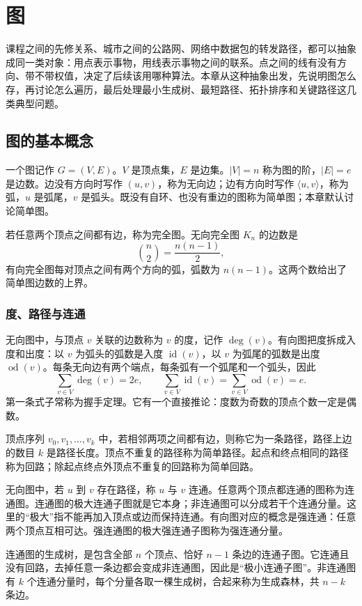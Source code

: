 \section{图}

课程之间的先修关系、城市之间的公路网、网络中数据包的转发路径，都可以抽象成同一类对象：用点表示事物，用线表示事物之间的联系。点之间的线有没有方向、带不带权值，决定了后续该用哪种算法。本章从这种抽象出发，先说明图怎么存，再讨论怎么遍历，最后处理最小生成树、最短路径、拓扑排序和关键路径这几类典型问题。

\subsection{图的基本概念}

一个图记作 $G=(V,E)$。$V$ 是顶点集，$E$ 是边集。$|V|=n$ 称为图的阶，$|E|=e$ 是边数。边没有方向时写作 $(u,v)$，称为无向边；边有方向时写作 $\langle u,v\rangle$，称为弧，$u$ 是弧尾，$v$ 是弧头。既没有自环、也没有重边的图称为简单图；本章默认讨论简单图。

若任意两个顶点之间都有边，称为完全图。无向完全图 $K_n$ 的边数是
\[
\binom{n}{2}=\frac{n(n-1)}{2},
\]
有向完全图每对顶点之间有两个方向的弧，弧数为 $n(n-1)$。这两个数给出了简单图边数的上界。

\subsubsection{度、路径与连通}

无向图中，与顶点 $v$ 关联的边数称为 $v$ 的度，记作 $\deg(v)$。有向图把度拆成入度和出度：以 $v$ 为弧头的弧数是入度 $\operatorname{id}(v)$，以 $v$ 为弧尾的弧数是出度 $\operatorname{od}(v)$。每条无向边有两个端点，每条弧有一个弧尾和一个弧头，因此
\[
\sum_{v\in V}\deg(v)=2e,
\qquad
\sum_{v\in V}\operatorname{id}(v)
=\sum_{v\in V}\operatorname{od}(v)=e.
\]
第一条式子常称为握手定理。它有一个直接推论：度数为奇数的顶点个数一定是偶数。

顶点序列 $v_0,v_1,\ldots,v_k$ 中，若相邻两项之间都有边，则称它为一条路径，路径上边的数目 $k$ 是路径长度。顶点不重复的路径称为简单路径。起点和终点相同的路径称为回路；除起点终点外顶点不重复的回路称为简单回路。

无向图中，若 $u$ 到 $v$ 存在路径，称 $u$ 与 $v$ 连通。任意两个顶点都连通的图称为连通图。连通图的极大连通子图就是它本身；非连通图可以分成若干个连通分量。这里的“极大”指不能再加入顶点或边而保持连通。有向图对应的概念是强连通：任意两个顶点互相可达。强连通图的极大强连通子图称为强连通分量。

连通图的生成树，是包含全部 $n$ 个顶点、恰好 $n-1$ 条边的连通子图。它连通且没有回路，去掉任意一条边都会变成非连通图，因此是“极小连通子图”。非连通图有 $k$ 个连通分量时，每个分量各取一棵生成树，合起来称为生成森林，共 $n-k$ 条边。

